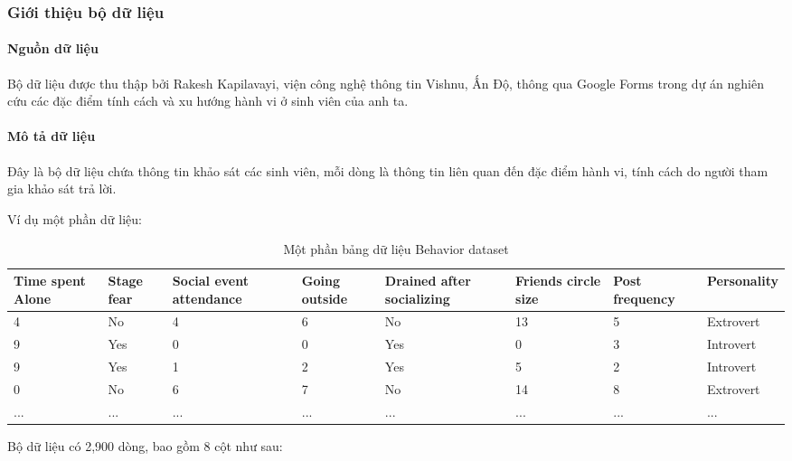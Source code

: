 \subsubsection{Giới thiệu bộ dữ liệu}
    \paragraph{Nguồn dữ liệu}
    \leavevmode

    Bộ dữ liệu được thu thập bởi Rakesh Kapilavayi, viện công nghệ thông tin Vishnu, Ấn Độ, thông qua Google Forms trong dự án nghiên cứu các đặc điểm tính cách và xu hướng hành vi ở sinh viên của anh ta. 

    \paragraph{Mô tả dữ liệu}
    \leavevmode

    Đây là bộ dữ liệu chứa thông tin khảo sát các sinh viên, mỗi dòng là thông tin liên quan đến đặc điểm hành vi, tính cách do người tham gia khảo sát trả lời. 

    Ví dụ một phần dữ liệu:

    \begin{table}[htbp]
    \centering
    \caption{Một phần bảng dữ liệu Behavior dataset}
    \label{tab:stat-behavior-exp}
        \begin{tabular}{|p{1.5cm}|p{1.5cm}|p{2cm}|p{1.5cm}|p{2cm}|p{2cm}|p{1.75cm}|p{2cm}|}
        \hline
        Time spent Alone & Stage fear & Social event attendance & Going outside & Drained after socializing & Friends circle size & Post frequency & Personality \\
        \hline
        4 & No & 4 & 6 & No & 13 & 5 & Extrovert \\
        \hline
        9 & Yes & 0 & 0 & Yes & 0 & 3 & Introvert \\
        \hline
        9 & Yes & 1 & 2 & Yes & 5 & 2 & Introvert \\
        \hline
        0 & No & 6 & 7 & No & 14 & 8 & Extrovert \\
        \hline
        ... & ... & ... & ... & ... & ... & ... & ... \\
        \hline
        \end{tabular}

    \end{table}

    Bộ dữ liệu có 2,900 dòng, bao gồm 8 cột như sau:

